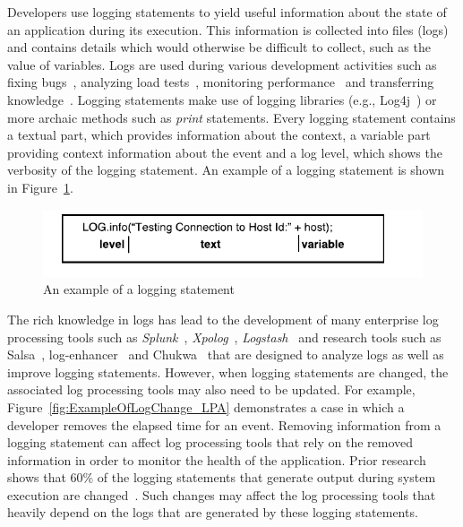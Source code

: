 

Developers use logging statements to yield useful information about the state of an application during its execution. This information is collected into files (logs) and contains details which would otherwise be difficult to collect, such as the value of variables. Logs are used during various development activities such as fixing bugs~\cite{ConsoleLogs,JGLouMining,QFuanomaly}, analyzing load tests~\cite{Automatic}, monitoring performance~\cite{Yuan} and transferring knowledge~\cite{IanWCRE}.
Logging statements make use of logging libraries (e.g., Log4j~\cite{log4j}) or more archaic methods such as \textsl{print} statements. Every logging statement contains a textual part, which provides information about the context, a variable part providing context information about the event and a log level, which shows the verbosity of the logging statement. An example of a logging statement is shown in Figure~\ref{fig:logexample}.

\begin{figure}[tb]
	\centering
	\includegraphics[width=1\columnwidth]{logexample}
	\caption{An example of a logging statement}
	\label{fig:logexample}
\end{figure}




The rich knowledge in logs has lead to the development of many enterprise log processing tools such as \textsl{Splunk}~\cite{carasso2012exploring}, \textsl{Xpolog}~\cite{xpolog}, \textsl{Logstash}~\cite{xu2013detecting} and research tools such as Salsa~\cite{TanSalsa}, log-enhancer~\cite{Yuan} and Chukwa~\cite{chukwa} that are designed to analyze logs as well as improve logging statements. However, when logging statements are changed, the associated log processing tools may also need to be updated. For example, Figure~\ref{fig:ExampleOfLogChange_LPA} demonstrates a case in which a developer removes the elapsed time for an event. Removing information from a logging statement can affect log processing tools that rely on the removed information in order to monitor the health of the application. Prior research shows that 60\% of the logging statements that generate output during system execution are changed~\cite{IanWCRE}. Such changes may affect the log processing tools that heavily depend on the logs that are generated by these logging statements.

